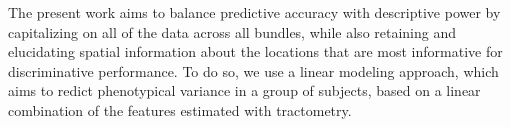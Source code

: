 




The present work aims to balance predictive
accuracy with descriptive power \cite{Murdoch2019-ax, Breiman2001-uz}
by capitalizing on all of the data across all bundles, while also retaining and
elucidating spatial information about the locations that are most informative
for discriminative performance. To do so, we use a linear modeling approach,
which aims to redict phenotypical variance in a group of subjects, based on a
linear combination of the features estimated with tractometry.


